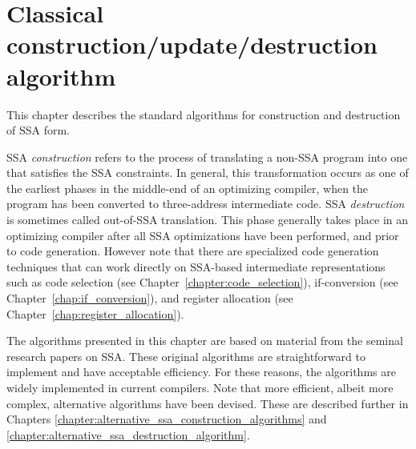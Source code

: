 \chapter{Classical construction/update/destruction algorithm }
\label{chap:classical_construction}

\graphicspath{{Figures/}{classical_construction_algorithm/Figures/}{part1/classical_construction_algorithm/Figures/}}


\def\phiops{$\phi$-functions}
\def\phiop{$\phi$-function}

\def\undef{\perp}
\def\DF{\mathrm{DF}}
\def\iDF{\mathrm{iDF}}
\def\join{\J}


This chapter describes the standard algorithms for construction and
destruction of SSA form.

SSA \emph{construction} refers to the process of translating a non-SSA program into
one that satisfies the SSA constraints. In general, this transformation
occurs as one of the
earliest phases in the middle-end of an optimizing compiler, when the program
has been converted to three-address intermediate code.
SSA \emph{destruction} is sometimes called out-of-SSA translation. This phase
generally
takes place in an optimizing compiler after all SSA optimizations have
been performed, and prior to code generation. However note that there are
specialized code generation techniques that can work directly on SSA-based
intermediate representations such as code selection (see
Chapter~\ref{chapter:code_selection}), if-conversion (see
Chapter~\ref{chap:if_conversion}),
and register allocation (see Chapter~\ref{chap:register_allocation}).

The algorithms presented in this chapter are
based on material from the seminal research papers on SSA.
These original algorithms are 
straightforward to implement and have acceptable efficiency.
For these reasons, the algorithms
are widely implemented in current compilers.
Note that more
efficient, albeit more complex, alternative algorithms have been devised.
These are described further in Chapters 
\ref{chapter:alternative_ssa_construction_algorithms}
and
\ref{chapter:alternative_ssa_destruction_algorithm}.


